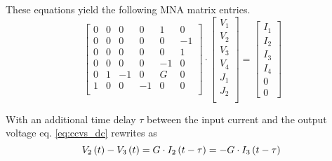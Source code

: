 These equations yield the following MNA matrix entries.
\begin{equation}
\begin{bmatrix}
0 & 0 & 0 & 0 & 1 & 0\\
0 & 0 & 0 & 0 & 0 & -1\\
0 & 0 & 0 & 0 & 0 & 1\\
0 & 0 & 0 & 0 & -1 & 0\\
0 & 1 & -1 & 0 & G & 0\\
1 & 0 & 0 & -1 & 0 & 0\\
\end{bmatrix}
\cdot
\begin{bmatrix}
V_1\\
V_2\\
V_3\\
V_4\\
J_1\\
J_2\\
\end{bmatrix}
=
\begin{bmatrix}
I_1\\
I_2\\
I_3\\
I_4\\
0\\
0
\end{bmatrix}
\end{equation}

With an additional time delay $\tau$ between the input current and
the output voltage eq. \eqref{eq:ccvs_dc} rewrites as
\begin{equation}
\label{eq:ccvs_delay}
V_2\left(t\right) - V_3\left(t\right) = G\cdot I_2\left(t - \tau\right) = -G\cdot I_3\left(t - \tau\right)\\
\end{equation}

